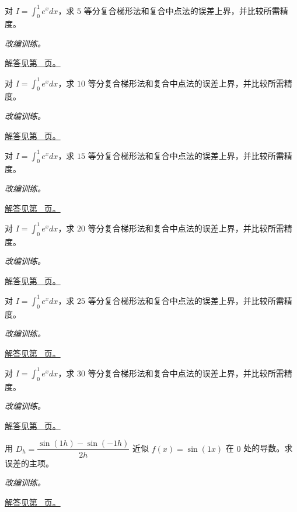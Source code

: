 \documentclass[UTF8,12pt,a4paper,fontset=fandol]{ctexart}
\begin{document}
\begin{example}[用导数界选择网格]\label{ex:c18q13}
对 $I=\int_0^1e^x dx$，求 $5$ 等分复合梯形法和复合中点法的误差上界，并比较所需精度。
\par\textit{改编训练。}\par\hyperref[ans:c18q13]{解答见第~\pageref{ans:c18q13} 页。}
\end{example}
\begin{example}[用导数界选择网格]\label{ex:c18q14}
对 $I=\int_0^1e^x dx$，求 $10$ 等分复合梯形法和复合中点法的误差上界，并比较所需精度。
\par\textit{改编训练。}\par\hyperref[ans:c18q14]{解答见第~\pageref{ans:c18q14} 页。}
\end{example}
\begin{example}[用导数界选择网格]\label{ex:c18q15}
对 $I=\int_0^1e^x dx$，求 $15$ 等分复合梯形法和复合中点法的误差上界，并比较所需精度。
\par\textit{改编训练。}\par\hyperref[ans:c18q15]{解答见第~\pageref{ans:c18q15} 页。}
\end{example}
\begin{example}[用导数界选择网格]\label{ex:c18q16}
对 $I=\int_0^1e^x dx$，求 $20$ 等分复合梯形法和复合中点法的误差上界，并比较所需精度。
\par\textit{改编训练。}\par\hyperref[ans:c18q16]{解答见第~\pageref{ans:c18q16} 页。}
\end{example}
\begin{example}[用导数界选择网格]\label{ex:c18q17}
对 $I=\int_0^1e^x dx$，求 $25$ 等分复合梯形法和复合中点法的误差上界，并比较所需精度。
\par\textit{改编训练。}\par\hyperref[ans:c18q17]{解答见第~\pageref{ans:c18q17} 页。}
\end{example}
\begin{example}[用导数界选择网格]\label{ex:c18q18}
对 $I=\int_0^1e^x dx$，求 $30$ 等分复合梯形法和复合中点法的误差上界，并比较所需精度。
\par\textit{改编训练。}\par\hyperref[ans:c18q18]{解答见第~\pageref{ans:c18q18} 页。}
\end{example}
\begin{example}[中心差分的截断误差]\label{ex:c18q19}
用 $D_h=\dfrac{\sin(1h)-\sin(-1h)}{2h}$ 近似 $f(x)=\sin(1x)$ 在 $0$ 处的导数。求误差的主项。
\par\textit{改编训练。}\par\hyperref[ans:c18q19]{解答见第~\pageref{ans:c18q19} 页。}
\end{example}
\end{document}
